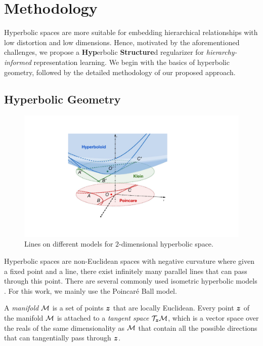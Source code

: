 \section{Methodology}
\label{sec:methodology}

Hyperbolic spaces are more suitable for embedding hierarchical relationships with low distortion \citep{Sarkar_2012} and low dimensions. Hence, motivated by the aforementioned challenges, we propose a \textbf{Hyp}erbolic \textbf{Structure}d regularizer for \emph{hierarchy-informed} representation learning. We begin with the basics of hyperbolic geometry, followed by the detailed methodology of our proposed approach.

\subsection{Hyperbolic Geometry}
\begin{figure}
\centering
\vspace{-1em}
\includegraphics[width=.95\linewidth]{figures/hyperbolic.pdf}
\caption{Lines on different models for $2$-dimensional hyperbolic space.}
\vspace{-1em}
\label{fig:hyperbolic_models}
\end{figure}

Hyperbolic spaces are non-Euclidean spaces with negative curvature where given a fixed point and a line, there exist infinitely many parallel lines that can pass through this point. There are several commonly used isometric hyperbolic models \citep{cannon1997hyperbolic}. For this work, we mainly use the Poincaré Ball model. 

\begin{definition}[Manifold]
\label{eq:manifold}
A \textit{manifold} ${\mathcal{M}}$ is a set of points ${\bm{z}}$ that are locally Euclidean. Every point ${\bm{z}}$ of the manifold ${\mathcal{M}}$ is attached to a \textit{tangent space} ${\mathcal{T}}_{\bm{z}} {\mathcal{M}}$, which is a vector space over the reals of the same dimensionality as ${\mathcal{M}}$ that contain all the possible directions that can tangentially pass through ${\bm{z}}$.
\end{definition}

